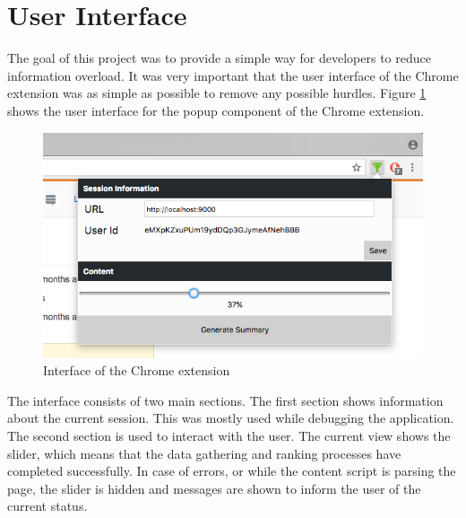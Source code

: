 \section{User Interface}\label{sec:results}
The goal of this project was to provide a simple way for developers to reduce information overload. It was very important that the user interface of the Chrome extension was as simple as possible to remove any possible hurdles. Figure \ref{fig:chromeExtensionInterfaceScreenshot} shows the user interface for the popup component of the Chrome extension. 

\begin{figure}[H]
\centering
\includegraphics{Figures/ChromeUI}
\caption{Interface of the Chrome extension}
\label{fig:chromeExtensionInterfaceScreenshot}
\end{figure}

The interface consists of two main sections. The first section shows information about the current session. This was mostly used while debugging the application. The second section is used to interact with the user. The current view shows the slider, which means that the data gathering and ranking processes have completed successfully. In case of errors, or while the content script is parsing the page, the slider is hidden and messages are shown to inform the user of the current status. 

